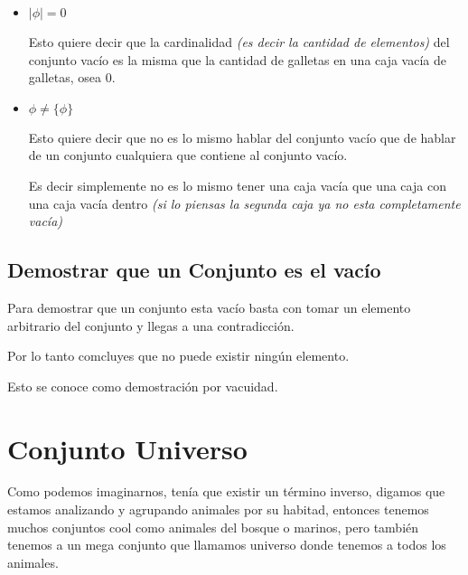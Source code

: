 \documentclass[12pt, fleqn]{report}                             %
\begin{document}
                \begin{itemize}
                    \item $|\phi| = 0$

                            Esto quiere decir que la cardinalidad \emph{(es decir
                            la cantidad de elementos)} del conjunto vacío es la misma que 
                            la cantidad de galletas en una caja vacía de galletas, osea 0.

                    \item $\phi \neq \{\phi\}$

                            Esto quiere decir que no es lo mismo hablar del conjunto
                            vacío que de hablar de un conjunto cualquiera que contiene al
                            conjunto vacío.

                            Es decir simplemente no es lo mismo tener una caja vacía que una caja
                            con una caja vacía dentro \emph{(si lo piensas la segunda caja ya 
                            no esta completamente vacía)}
                \end{itemize}


            \subsection{Demostrar que un Conjunto es el vacío}

                Para demostrar que un conjunto esta vacío basta con tomar
                un elemento arbitrario del conjunto y llegas a una contradicción.

                Por lo tanto comcluyes que no puede existir ningún elemento.

                Esto se conoce como demostración por vacuidad.


        \clearpage
        \section{Conjunto Universo}
            
            Como podemos imaginarnos, tenía que existir un término inverso, digamos que estamos
            analizando y agrupando animales por su habitad, entonces tenemos muchos conjuntos cool
            como animales del bosque o marinos, pero también tenemos a un mega conjunto que llamamos
            universo donde tenemos a todos los animales.
\end{document}
